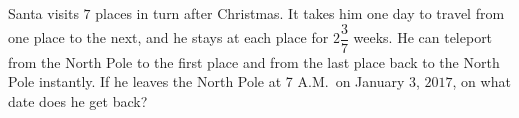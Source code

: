 Santa visits $7$ places in turn after Christmas. It takes him one day to travel from one place to the next, and he stays at each place for $2\dfrac{3}{7}$ weeks. He can teleport from the North Pole to the first place and from the last place back to the North Pole instantly. If he leaves the North Pole at 7 A.M.\ on January $3$, $2017$, on what date does he get back?
